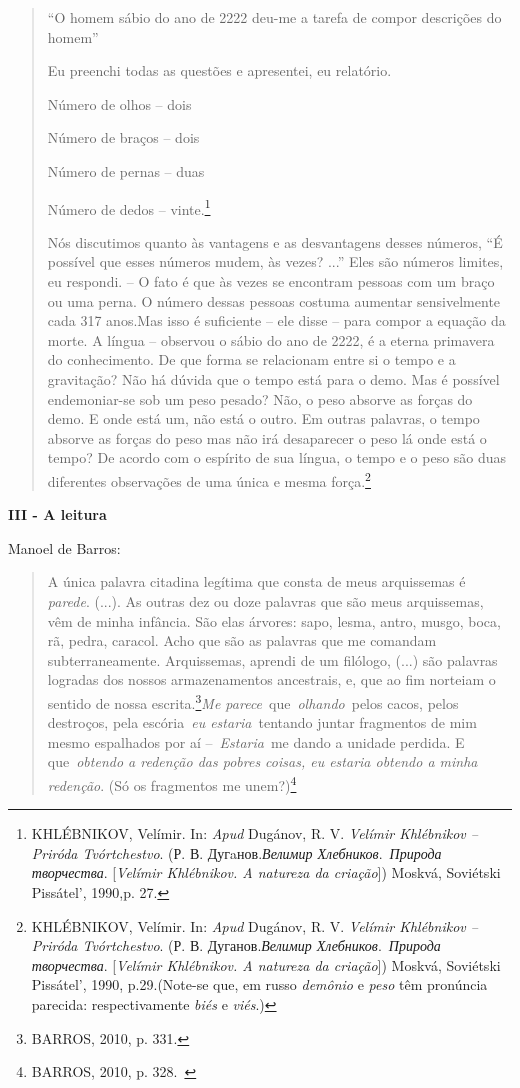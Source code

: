 \begin{quote}
``O homem sábio do ano de 2222 deu-me a tarefa de compor descrições do
homem''

Eu preenchi todas as questões e apresentei, eu relatório.

Número de olhos -- dois

Número de braços -- dois

Número de pernas -- duas

Número de dedos -- vinte.\footnote{KHLÉBNIKOV, Velímir. In: \emph{Apud}
  Dugánov, R. V. \emph{Velímir Khlébnikov -- Priróda Tvórtchestvo}. (Р.
  В. Дугaнов.\emph{Велимир Хлебников}.~\emph{Природа творчества}.
  {[}\emph{Velímir Khlébnikov. A natureza da criação}{]}) Moskvá,
  Soviétski Pissátel', 1990,p. 27.}

Nós discutimos quanto às vantagens e as desvantagens desses números, ``É
possível que esses números mudem, às vezes? ...'' Eles são números
limites, eu respondi. -- O fato é que às vezes se encontram pessoas com
um braço ou uma perna. O número dessas pessoas costuma aumentar
sensivelmente cada 317 anos.Mas isso é suficiente -- ele disse -- para
compor a equação da morte. A língua -- observou o sábio do ano de 2222,
é a eterna primavera do conhecimento. De que forma se relacionam entre
si o tempo e a gravitação? Não há dúvida que o tempo está para o demo.
Mas é possível endemoniar-se sob um peso pesado? Não, o peso absorve as
forças do demo. E onde está um, não está o outro. Em outras palavras, o
tempo absorve as forças do peso mas não irá desaparecer o peso lá onde
está o tempo? De acordo com o espírito de sua língua, o tempo e o peso
são duas diferentes observações de uma única e mesma força.\footnote{KHLÉBNIKOV,
  Velímir. In: \emph{Apud} Dugánov, R. V. \emph{Velímir Khlébnikov --
  Priróda Tvórtchestvo}. (Р. В. Дуганов.\emph{Велимир
  Хлебников}.~\emph{Природа творчества}. {[}\emph{Velímir Khlébnikov. A
  natureza da criação}{]}) Moskvá, Soviétski Pissátel', 1990,
  p.29.(Note-se que, em russo \emph{demônio} e \emph{peso} têm pronúncia
  parecida: respectivamente \emph{biés} e \emph{viés}.)}
\end{quote}

\textbf{III - A leitura}

Manoel de Barros:

\begin{quote}
A única palavra citadina legítima que consta de meus arquissemas é
\emph{parede}. (...). As outras dez ou doze palavras que são meus
arquissemas, vêm de minha infância. São elas árvores: sapo, lesma,
antro, musgo, boca, rã, pedra, caracol. Acho que são as palavras que me
comandam subterraneamente. Arquissemas, aprendi de um filólogo, (...)
são palavras logradas dos nossos armazenamentos ancestrais, e, que ao
fim norteiam o sentido de nossa escrita.\footnote{BARROS, 2010, p. 331.}\emph{Me
parece}~que~\emph{olhando}~pelos cacos, pelos destroços, pela
escória~\emph{eu estaria}~tentando juntar fragmentos de mim mesmo
espalhados por aí --~\emph{Estaria}~me dando a unidade perdida. E
que~\emph{obtendo a redenção das pobres coisas, eu estaria obtendo a
minha redenção}. (Só os fragmentos me unem?)\footnote{BARROS, 2010, p.
  328.~}
\end{quote}

